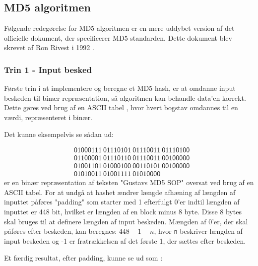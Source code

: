 \documentclass[12pt]{article}
\begin{document}
\subsection{MD5 algoritmen}
Følgende redegørelse for MD5 algoritmen er en mere uddybet version af det officielle dokument, der specificerer MD5 standarden. Dette dokument blev skrevet af Ron Rivest i 1992 \cite{rivest_md5_1992}.


\subsubsection{Trin 1 - Input besked}
Første trin i at implementere og beregne et MD5 hash, er at omdanne input beskeden til binær repræsentation, så algoritmen kan behandle data'en korrekt. Dette gøres ved brug af en ASCII tabel \footnotemark[3], hvor  hvert bogstav omdannes til en værdi, repræsenteret i binær.

Det kunne eksempelvis se sådan ud: 

\begin{equation}
\begin{split}
&\mathsf{01000111 \ 01110101 \ 01110011 \ 01110100} \\
&\mathsf{01100001 \ 01110110 \ 01110011 \ 00100000} \\
&\mathsf{01001101 \ 01000100 \ 00110101 \ 00100000} \\
&\mathsf{01010011 \ 01001111 \ 01010000 } 
\end{split}
\label{step-1-binary}
\end{equation}
\equationautorefname{~\ref{step-1-binary}} er en binær repræsentation af teksten "Gustavs MD5 SOP" oversat ved brug af en ASCII tabel. For at undgå at hashet ændrer længde afhæning af længden af inputtet påføres "padding" som starter med 1 efterfulgt 0'er indtil længden af inputtet er 448 bit, hvilket er længden af en block minus 8 byte. Disse 8 bytes skal bruges til at definere længden af input beskeden. Mængden af 0'er, der skal påføres efter beskeden, kan beregnes: \(448-1-n\), hvor \verb|n| beskriver længden af input beskeden og -1 er fratrækkelsen af det første 1, der sættes efter beskeden. 


Et færdig resultat, efter padding, kunne se ud som \equationautorefname{~\ref{step-2-binary}}:
\end{document}
